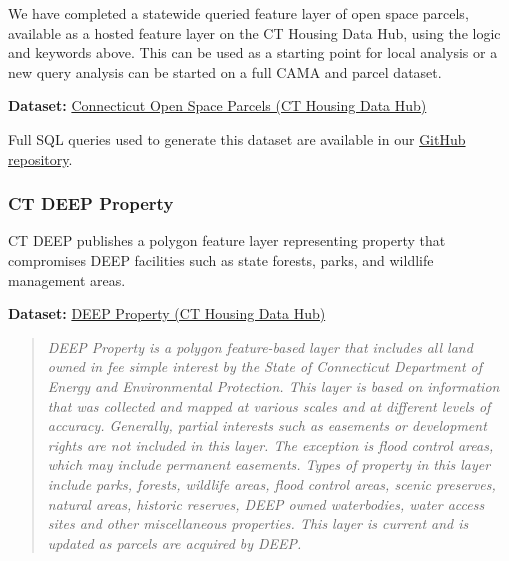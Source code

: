 \documentclass[
  letterpaper,
  DIV=11,
  numbers=noendperiod]{scrreprt}
\begin{document}
\begin{tcolorbox}[enhanced jigsaw, arc=.35mm, bottomrule=.15mm, breakable, colback=white, colframe=quarto-callout-note-color-frame, left=2mm, leftrule=.75mm, opacityback=0, rightrule=.15mm, toprule=.15mm]

We have completed a statewide queried feature layer of open space
parcels, available as a hosted feature layer on the CT Housing Data Hub,
using the logic and keywords above. This can be used as a starting point
for local analysis or a new query analysis can be started on a full CAMA
and parcel dataset.

\textbf{Dataset:}
\href{https://housingmaps.ct.gov/datasets/ctmaps::connecticut-protected-open-space-parcels/about}{Connecticut
Open Space Parcels (CT Housing Data Hub)}

Full SQL queries used to generate this dataset are available in our
\href{https://github.com/ctgisoffice/housing/blob/main/SQL_Open_Space_Parcels.sql}{GitHub
repository}.

\end{tcolorbox}

\subsubsection{CT DEEP Property}\label{sec-ct-deep-property}

CT DEEP publishes a polygon feature layer representing property that
compromises DEEP facilities such as state forests, parks, and wildlife
management areas.

\textbf{Dataset:}
\href{https://housingmaps.ct.gov/datasets/CTDEEP::deep-property-3/about}{DEEP
Property (CT Housing Data Hub)}

\begin{quote}
\emph{DEEP Property is a polygon feature-based layer that includes all
land owned in fee simple interest by the State of Connecticut Department
of Energy and Environmental Protection. This layer is based on
information that was collected and mapped at various scales and at
different levels of accuracy. Generally, partial interests such as
easements or development rights are not included in this layer. The
exception is flood control areas, which may include permanent easements.
Types of property in this layer include parks, forests, wildlife areas,
flood control areas, scenic preserves, natural areas, historic reserves,
DEEP owned waterbodies, water access sites and other miscellaneous
properties. This layer is current and is updated as parcels are acquired
by DEEP.}
\end{quote}
\end{document}
